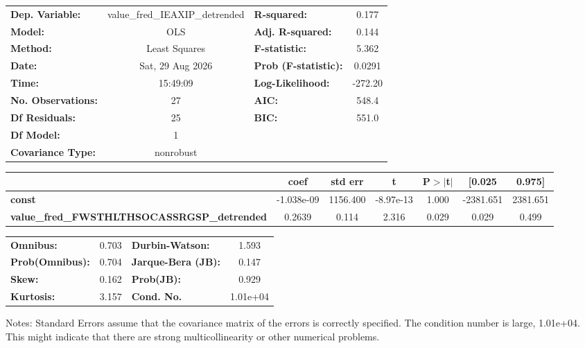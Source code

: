 \begin{center}
\begin{tabular}{lclc}
\toprule
\textbf{Dep. Variable:}                             & value\_fred\_IEAXIP\_detrended & \textbf{  R-squared:         } &     0.177   \\
\textbf{Model:}                                     &              OLS               & \textbf{  Adj. R-squared:    } &     0.144   \\
\textbf{Method:}                                    &         Least Squares          & \textbf{  F-statistic:       } &     5.362   \\
\textbf{Date:}                                      &        Sat, 29 Aug 2026        & \textbf{  Prob (F-statistic):} &   0.0291    \\
\textbf{Time:}                                      &            15:49:09            & \textbf{  Log-Likelihood:    } &   -272.20   \\
\textbf{No. Observations:}                          &                 27             & \textbf{  AIC:               } &     548.4   \\
\textbf{Df Residuals:}                              &                 25             & \textbf{  BIC:               } &     551.0   \\
\textbf{Df Model:}                                  &                  1             & \textbf{                     } &             \\
\textbf{Covariance Type:}                           &           nonrobust            & \textbf{                     } &             \\
\bottomrule
\end{tabular}
\begin{tabular}{lcccccc}
                                                    & \textbf{coef} & \textbf{std err} & \textbf{t} & \textbf{P$> |$t$|$} & \textbf{[0.025} & \textbf{0.975]}  \\
\midrule
\textbf{const}                                      &   -1.038e-09  &     1156.400     & -8.97e-13  &         1.000        &    -2381.651    &     2381.651     \\
\textbf{value\_fred\_FWSTHLTHSOCASSRGSP\_detrended} &       0.2639  &        0.114     &     2.316  &         0.029        &        0.029    &        0.499     \\
\bottomrule
\end{tabular}
\begin{tabular}{lclc}
\textbf{Omnibus:}       &  0.703 & \textbf{  Durbin-Watson:     } &    1.593  \\
\textbf{Prob(Omnibus):} &  0.704 & \textbf{  Jarque-Bera (JB):  } &    0.147  \\
\textbf{Skew:}          &  0.162 & \textbf{  Prob(JB):          } &    0.929  \\
\textbf{Kurtosis:}      &  3.157 & \textbf{  Cond. No.          } & 1.01e+04  \\
\bottomrule
\end{tabular}
\end{center}

Notes: \newline
 [1] Standard Errors assume that the covariance matrix of the errors is correctly specified. \newline
 [2] The condition number is large, 1.01e+04. This might indicate that there are \newline
 strong multicollinearity or other numerical problems.